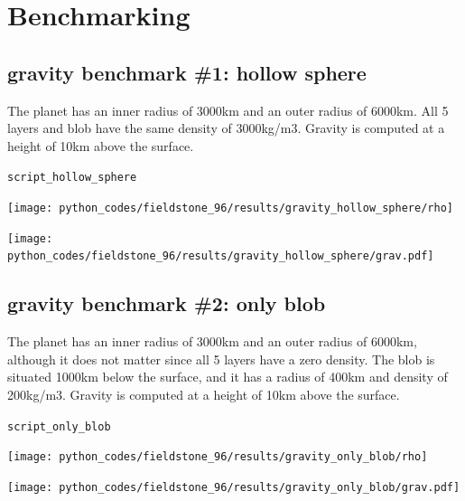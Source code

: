 \section*{Benchmarking}

\subsection*{gravity benchmark \#1: hollow sphere}

The planet has an inner radius of 3000km and an outer radius of 6000km.
All 5 layers and blob have the same density of 3000kg/m3.
Gravity is computed at a height of 10km above the surface.

{\tt script\_hollow\_sphere}

\begin{center}
\texttt{[image: python\_codes/fieldstone\_96/results/gravity\_hollow\_sphere/rho]}
\end{center}

\begin{center}
\texttt{[image: python\_codes/fieldstone\_96/results/gravity\_hollow\_sphere/grav.pdf]}
\end{center}

\newpage
\subsection*{gravity benchmark \#2: only blob}

The planet has an inner radius of 3000km and an outer radius of 6000km,
although it does not matter since all 5 layers have a zero density. 
The blob is situated 1000km below the surface, and it has a radius of 400km and density of 200kg/m3.
Gravity is computed at a height of 10km above the surface.

{\tt script\_only\_blob}

\begin{center}
\texttt{[image: python\_codes/fieldstone\_96/results/gravity\_only\_blob/rho]}
\end{center}

\begin{center}
\texttt{[image: python\_codes/fieldstone\_96/results/gravity\_only\_blob/grav.pdf]}
\end{center}













